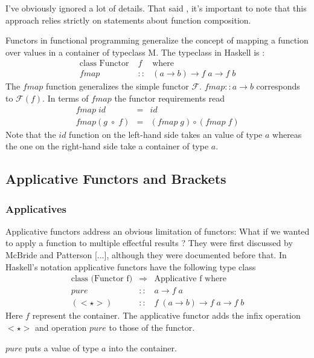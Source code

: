 \documentclass[12pt,fleqn]{article}
\begin{document}
I've obviously ignored a lot of details.
That said , it's important to note that this approach relies strictly on statements about function composition.


Functors in functional programming generalize the concept of mapping a function over values in a container of typeclass M.
The typeclass in Haskell is :
\begin{eqnarray*}
\mbox{class Functor}\; &f& \mbox{where} \\
fmap &::& (a \rightarrow b) \rightarrow f\;a \rightarrow f\;b
\end{eqnarray*}
The $fmap$ function generalizes the simple functor $\mathcal{F}$. 
$fmap::a \rightarrow b$ corresponds to $\mathcal{F}(f)$.
In terms of $fmap$ the functor requirements read 
\begin{eqnarray*}
fmap \; id &=& id  \\
fmap (g \; \circ \; f) &=& (fmap \;g) \circ (fmap \;f) 
\end{eqnarray*}
Note that the $id$ function on the left-hand side takes an value of type $a$ whereas the one on the right-hand side take a container of type $a$.

%
%
%
\subsection{Applicative Functors and Brackets}
%
%
%
\subsubsection{Applicatives}
%
%
%
Applicative functors address an obvious limitation of functors: What if we wanted to apply a function to multiple effectful results ?
They were first discussed by McBride and Patterson [...], although they were documented before that.
In Haskell's notation applicative functors have the following type class 
\begin{eqnarray*}
\mbox{class (Functor f)} &\Rightarrow& \mbox{Applicative f where} \\
pure  &::& a \rightarrow f\;a \\
(<\star>) &::& f \; ( a \rightarrow b) \rightarrow f \; a \rightarrow f\;b
\end{eqnarray*}
Here $f$ represent the container. 
The applicative functor adds the infix operation $<\star>$ and operation $pure$ to those of the functor.

$pure$ puts a value of type $a$ into the container.
\end{document}
